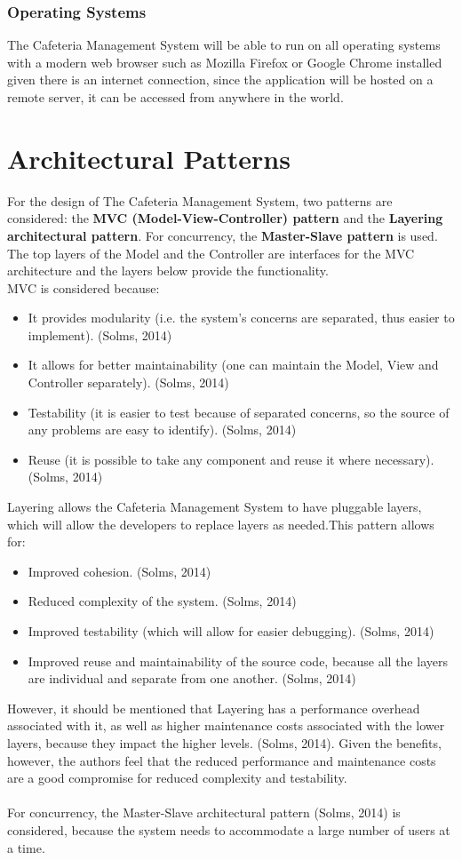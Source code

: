 \documentclass[a4paper,12pt]{article}
\begin{document}
\subsubsection{Operating Systems}
The Cafeteria Management System will be able to run on all operating systems with a modern web browser such as Mozilla Firefox or Google Chrome installed given there is an internet connection, since the application will be hosted on a remote server, it can be accessed from anywhere in the world.

\section{Architectural Patterns}
For the design of The Cafeteria Management System, two patterns are considered: the \textbf{MVC (Model-View-Controller) pattern} and the \textbf{Layering architectural pattern}. For concurrency, the \textbf{Master-Slave pattern} is used.\\
The top layers of the Model and the Controller are interfaces for the MVC architecture and the layers below provide the functionality.\\
MVC is considered because:
	\begin{itemize}
	\item It provides modularity (i.e. the system's concerns are separated, thus easier to implement). (Solms, 2014)
	\item It allows for better maintainability (one can maintain the Model, View and Controller separately). (Solms, 2014)			\item Testability (it is easier to test because of separated concerns, so the source of any problems are easy to identify). 	
	(Solms, 2014)
	\item Reuse (it is possible to take any component and reuse it where necessary). (Solms, 2014)
	\end{itemize} 
Layering allows the Cafeteria Management System to have pluggable layers, which will allow the developers to replace layers as needed.This pattern allows for: 
		\begin{itemize}
		\item Improved cohesion. (Solms, 2014)
		\item Reduced complexity of the system. (Solms, 2014)
		\item Improved testability (which will allow for easier debugging). (Solms, 2014)
		\item Improved reuse and maintainability of the source code, because all the layers are individual and separate 		
		from 	one another. (Solms, 2014)
		\end{itemize}
However, it should be mentioned that Layering has a performance overhead associated with it, as well as higher maintenance costs associated with the lower layers, because they impact the higher levels. (Solms, 2014). Given the benefits, however, the authors feel that the reduced performance and maintenance costs are a good compromise for reduced complexity and testability.\\
\\
For concurrency, the Master-Slave architectural pattern (Solms, 2014) is considered, because the system needs to accommodate a large number of users at a time.
\end{document}

